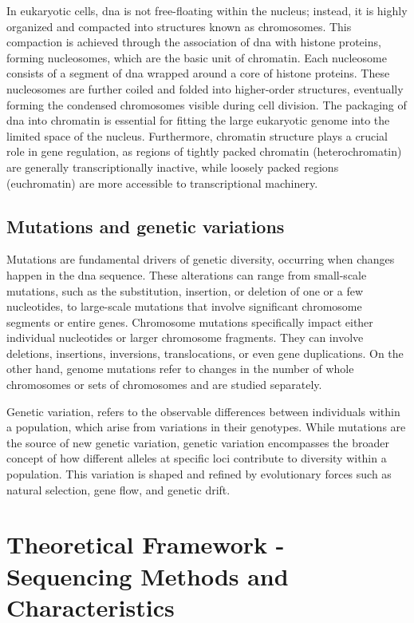 In eukaryotic cells, \ac{dna} is not free-floating within the nucleus; instead, it is highly organized and compacted into structures known as chromosomes. This compaction is achieved through the association of \ac{dna} with histone proteins, forming nucleosomes, which are the basic unit of chromatin. Each nucleosome consists of a segment of \ac{dna} wrapped around a core of histone proteins. These nucleosomes are further coiled and folded into higher-order structures, eventually forming the condensed chromosomes visible during cell division. The packaging of \ac{dna} into chromatin is essential for fitting the large eukaryotic genome into the limited space of the nucleus. Furthermore, chromatin structure plays a crucial role in gene regulation, as regions of tightly packed chromatin (heterochromatin) are generally transcriptionally inactive, while loosely packed regions (euchromatin) are more accessible to transcriptional machinery. \cite{Minchin2019}

\subsection{Mutations and genetic variations} \label{subsec:genetics_mutations}

Mutations are fundamental drivers of genetic diversity, occurring when changes happen in the \ac{dna} sequence. These alterations can range from small-scale mutations, such as the substitution, insertion, or deletion of one or a few nucleotides, to large-scale mutations that involve significant chromosome segments or entire genes. Chromosome mutations specifically impact either individual nucleotides or larger chromosome fragments. They can involve deletions, insertions, inversions, translocations, or even gene duplications. On the other hand, genome mutations refer to changes in the number of whole chromosomes or sets of chromosomes and are studied separately. \cite{merrick2016}

Genetic variation, refers to the observable differences between individuals within a population, which arise from variations in their genotypes. While mutations are the source of new genetic variation, genetic variation encompasses the broader concept of how different alleles at specific loci contribute to diversity within a population. This variation is shaped and refined by evolutionary forces such as natural selection, gene flow, and genetic drift. \cite{merrick2016}

\section{Theoretical Framework - Sequencing Methods and Characteristics} \label{sec:intro_sequencing}

